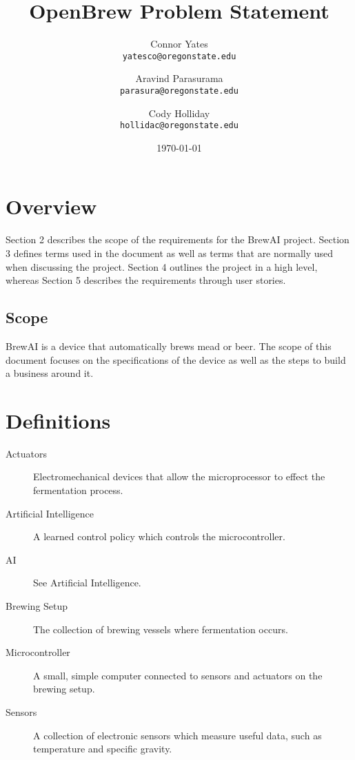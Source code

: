 \documentclass[draftclsnofoot,onecolumn,letterpaper,10pt]{article}
\author{Connor Yates\\
\texttt{yatesco@oregonstate.edu}
\and
Aravind Parasurama\\
\texttt{parasura@oregonstate.edu}
\and
Cody Holliday\\
\texttt{hollidac@oregonstate.edu}}
\date{\today}
\title{OpenBrew Problem Statement}
\begin{document}
\maketitle
\section{Overview}
Section 2 describes the scope of the requirements for the BrewAI project.
Section 3 defines terms used in the document as well as terms that are normally used when discussing the project.
Section 4 outlines the project in a high level, whereas Section 5 describes the requirements through user stories.

\subsection{Scope}
BrewAI is a device that automatically brews mead or beer.
The scope of this document focuses on the specifications of the device as well as the steps to build a business around it.


\section{Definitions}
\begin{description}
	\item[Actuators] Electromechanical devices that allow the microprocessor to effect the fermentation process.
	\item[Artificial Intelligence] A learned control policy which controls the microcontroller.
	\item[AI] See Artificial Intelligence.
	\item[Brewing Setup] The collection of brewing vessels where fermentation occurs.
	\item[Microcontroller] A small, simple computer connected to sensors and actuators on the brewing setup.
	\item[Sensors] A collection of electronic sensors which measure useful data, such as temperature and specific gravity.
\end{description}
\end{document}
